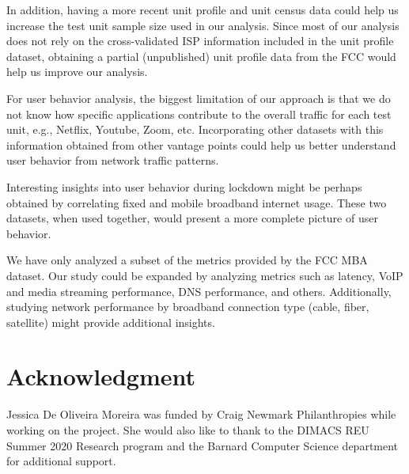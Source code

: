 \documentclass[conference,10pt]{IEEEtran}
\begin{document}
In addition, having a more recent unit profile and unit census data could help us increase the test unit sample size used in our analysis. Since most of our analysis does not rely on the cross-validated ISP information included in the unit profile dataset, obtaining a partial (unpublished) unit profile data from the FCC would help us improve our analysis.

For user behavior analysis, the biggest limitation of our approach is that we do not know how specific applications contribute to the overall traffic for each test unit, e.g., Netflix, Youtube, Zoom, etc. Incorporating other datasets with this information obtained from other vantage points could help us better understand user behavior from network traffic patterns.

Interesting insights into user behavior during lockdown might be perhaps obtained by correlating fixed and mobile broadband internet usage. These two datasets, when used together, would present a more complete picture of user behavior.

We have only analyzed a subset of the metrics provided by the FCC MBA dataset. Our study could be expanded by analyzing metrics such as latency, VoIP and media streaming performance, DNS performance, and others. Additionally, studying network performance by broadband connection type (cable, fiber, satellite) might provide additional insights. 

\section*{Acknowledgment}
\label{sec:acknowledgment}

Jessica De Oliveira Moreira was funded by Craig Newmark Philanthropies while working on the project. She would also like to thank to the DIMACS REU Summer 2020 Research program and the Barnard Computer Science department for additional support.



\end{document}
